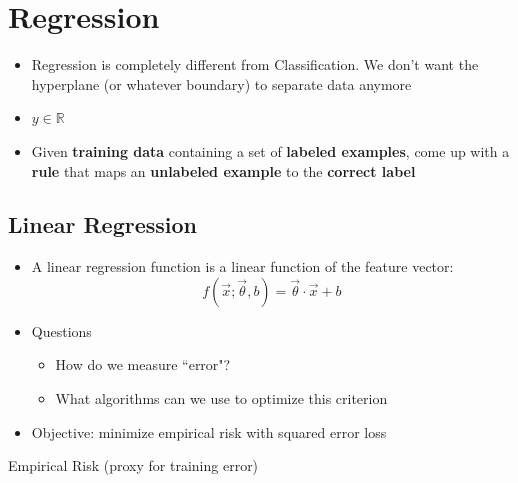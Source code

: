 \documentclass[10pt, oneside]{article}
\newcommand{\R}{\mathbb{R}}
\begin{document}
\section{Regression}

\begin{itemize}
    \item Regression is completely different from Classification. We don't want the hyperplane (or whatever boundary) to separate data anymore
    \item $y\in \R$
    \item Given \textbf{training data} containing a set of \textbf{labeled examples}, come up with a \textbf{rule} that maps an \textbf{unlabeled example} to the \textbf{correct label}
\end{itemize}

\subsection{Linear Regression}
\begin{itemize}
    \item A linear regression function is a linear function of the feature vector:\\
    $$f(\vec x;\vec \theta, b)=\vec \theta\cdot \vec x + b$$
    \item Questions
    \begin{itemize}
        \item How do we measure ``error"?
        \item What algorithms can we use to optimize this criterion
    \end{itemize}
    \item Objective: minimize empirical risk with squared error loss
\end{itemize}
Empirical Risk (proxy for training error)
\end{document}
